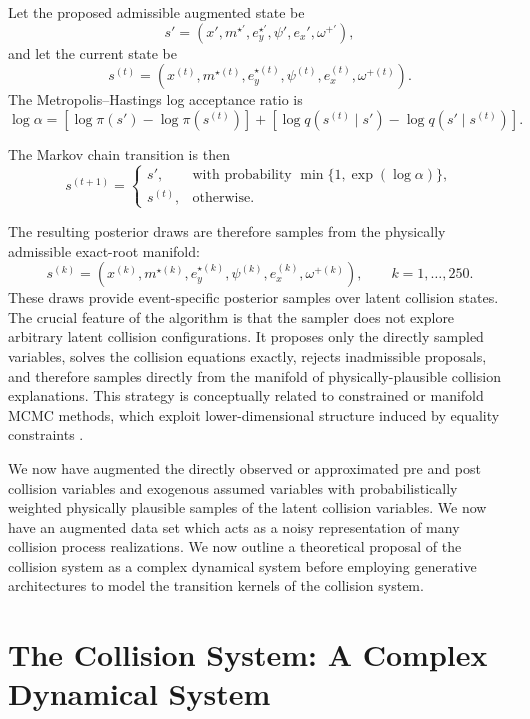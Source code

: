 \documentclass[11pt]{article}
\begin{document}
Let the proposed admissible augmented state be
\[
s'
=
\left(
x',
m^{\star\prime},
e_y^{\star\prime},
\psi',
e_x',
\omega^{+\prime}
\right),
\]
and let the current state be
\[
s^{(t)}
=
\left(
x^{(t)},
m^{\star(t)},
e_y^{\star(t)},
\psi^{(t)},
e_x^{(t)},
\omega^{+(t)}
\right).
\]
The Metropolis--Hastings log acceptance ratio is
\begin{equation}
\log \alpha
=
\left[
\log \pi(s')
-
\log \pi(s^{(t)})
\right]
+
\left[
\log q(s^{(t)}\mid s')
-
\log q(s'\mid s^{(t)})
\right].
\label{eq:mh_acceptance_ratio}
\end{equation}

The Markov chain transition is then
\[
s^{(t+1)}
=
\begin{cases}
s', & \text{with probability } \min\{1,\exp(\log \alpha)\}, \\[4pt]
s^{(t)}, & \text{otherwise}.
\end{cases}
\]

The resulting posterior draws are therefore samples from the physically
admissible exact-root manifold:
\[
s^{(k)}
=
\left(
x^{(k)},
m^{\star(k)},
e_y^{\star(k)},
\psi^{(k)},
e_x^{(k)},
\omega^{+(k)}
\right),
\qquad
k=1,\ldots,250.
\]
These draws provide event-specific posterior samples over latent collision states.
The crucial feature of the algorithm is that the sampler does not explore arbitrary
latent collision configurations. It proposes only the directly sampled variables,
solves the collision equations exactly, rejects inadmissible proposals, and therefore
samples directly from the manifold of physically-plausible collision explanations. This strategy is conceptually related to constrained or manifold MCMC methods, which exploit lower-dimensional structure induced by equality constraints \citep{brubaker2012family,byrne2013geodesic}.

We now have augmented the directly observed or approximated pre and post collision variables and exogenous assumed variables with probabilistically weighted physically plausible samples of the latent collision variables. We now have an augmented data set which acts as a noisy representation of many collision process realizations. We now outline a theoretical proposal of the collision system as a complex dynamical system before employing generative architectures to model the transition kernels of the collision system.

\section{The Collision System: A Complex Dynamical System}
\end{document}
